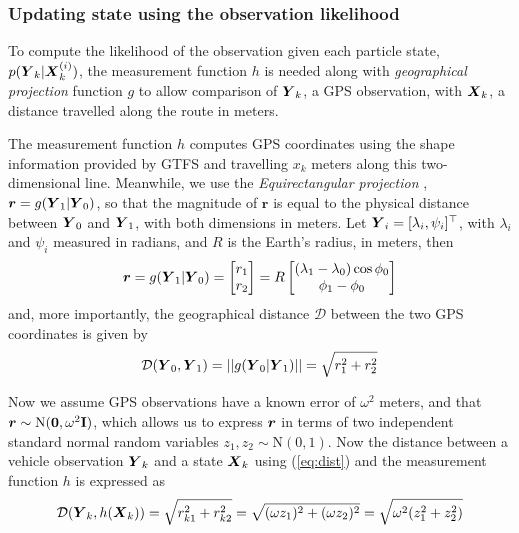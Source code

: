 

\subsubsection{Updating state using the observation likelihood}
\label{sec:pf_update}

To compute the likelihood of the observation given each particle state,
$p(\mbox{$\boldsymbol{Y}$}_k|\mbox{$\boldsymbol{X}$}_k^{(i)})$,
the measurement function $h$ is needed along with 
\emph{geographical projection} function $g$ to allow comparison of $\mbox{$\boldsymbol{Y}$}_k$,
a GPS observation, with $\mbox{$\boldsymbol{X}$}_k$, a distance travelled along the route in meters.

The measurement function $h$ computes GPS coordinates using the 
shape information provided by GTFS and travelling $x_k$ meters along 
this two-dimensional line.
Meanwhile, we use the \emph{Equirectangular projection} \citep{Snyder_1998},
$\boldsymbol{r} = g(\mbox{$\boldsymbol{Y}$}_1 | \mbox{$\boldsymbol{Y}$}_0)$,
so that the magnitude of $\boldsymbol{r}$ is equal to the physical distance
between $\mbox{$\boldsymbol{Y}$}_0$ and $\mbox{$\boldsymbol{Y}$}_1$, with both dimensions in meters.
Let $\mbox{$\boldsymbol{Y}$}_i = [\lambda_i, \psi_i]^\top$,
with $\lambda_i$ and $\psi_i$ measured in radians,  
and $R$ is the Earth's radius, in meters, then
\begin{equation}
\boldsymbol{r} = 
g(\mbox{$\boldsymbol{Y}$}_1 | \mbox{$\boldsymbol{Y}$}_0) = 
    \begin{bmatrix}
        r_1 \\ r_2
    \end{bmatrix} =
    R \begin{bmatrix}
        (\lambda_1 - \lambda_0)\cos\phi_0 \\
        \phi_1 - \phi_0
    \end{bmatrix}
\end{equation}
and, more importantly, the geographical distance $\mathcal{D}$ between the two 
GPS coordinates is given by
\begin{equation}
\label{eq:dist}
\mathcal{D}(\mbox{$\boldsymbol{Y}$}_0, \mbox{$\boldsymbol{Y}$}_1) = ||g(\mbox{$\boldsymbol{Y}$}_0 | \mbox{$\boldsymbol{Y}$}_1)|| = \sqrt{r_1^2 + r_2^2}
\end{equation}


Now we assume GPS observations have a known error of $\omega^2$ meters,
and that \mbox{$\boldsymbol{r} \sim \mathrm{N}(\boldsymbol{0}, \omega^2\mathbf{I})$},
which allows us to express $\boldsymbol{r}$ in terms of two independent
standard normal random variables $z_1, z_2 \sim \mathrm{N}(0,1)$.
Now the distance between a vehicle observation $\mbox{$\boldsymbol{Y}$}_k$
and a state $\mbox{$\boldsymbol{X}$}_k$ using (\ref{eq:dist}) and the measurement function $h$
is expressed as
\begin{equation}
\label{eq:obs_dist}
\mathcal{D}(\mbox{$\boldsymbol{Y}$}_k, h(\mbox{$\boldsymbol{X}$}_k)) = \sqrt{r_{k1}^2 + r_{k2}^2} 
    = \sqrt{(\omega z_1)^2 + (\omega z_2)^2}
    = \sqrt{\omega^2 (z_1^2 + z_2^2)}
\end{equation}

